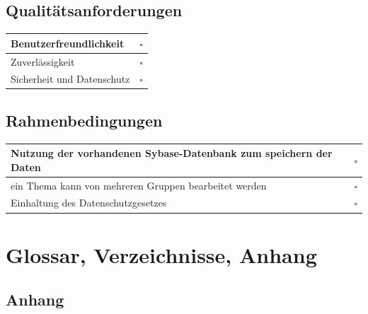 \documentclass{article}
\begin{document}
\subsection{Qualitätsanforderungen}
\begin{tabular}{p{17cm} c}
	Benutzerfreundlichkeit		&	$\square$	\\
\hline
	Zuverlässigkeit				&	$\square$	\\
\hline
	Sicherheit und Datenschutz	&	$\square$	\\
\end{tabular}

\subsection{Rahmenbedingungen}
\begin{tabular}{p{17cm} c}
	Nutzung der vorhandenen Sybase-Datenbank zum speichern der Daten	&	$\square$	\\
\hline
	ein Thema kann von mehreren Gruppen bearbeitet werden				&	$\square$	\\
\hline
	Einhaltung des Datenschutzgesetzes									&	$\square$	\\
\end{tabular}
\newpage

\section{Glossar, Verzeichnisse, Anhang}
\subsection{Anhang}
\end{document}
